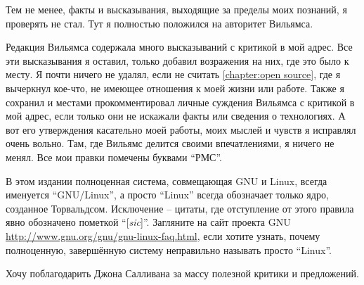 Тем не менее, факты и высказывания, выходящие за пределы моих познаний, я проверять не стал. Тут я полностью положился на авторитет Вильямса.

Редакция Вильямса содержала много высказываний с критикой в мой адрес. Все эти высказывания я оставил, только добавил возражения на них, где это было к месту. Я почти ничего не удалял, если не считать \autoref{chapter:open source}, где я вычеркнул кое-что, не имеющее отношения к моей жизни или работе. Также я сохранил и местами прокомментировал личные суждения Вильямса с критикой в мой адрес, если только они не искажали факты или сведения о технологиях. А вот его утверждения касательно моей работы, моих мыслей и чувств я исправлял очень вольно. Там, где Вильямс делится своими впечатлениями, я ничего не менял. Все мои правки помечены буквами \enquote{РМС}.

В этом издании полноценная система, совмещающая GNU и Linux, всегда именуется \enquote{GNU/Linux}, а просто \enquote{Linux} всегда обозначает только ядро, созданное Торвальдсом. Исключение -- цитаты, где отступление от этого правила явно обозначено пометкой \enquote{[\textit{sic}]}. Загляните на сайт проекта GNU \url{http://www.gnu.org/gnu/gnu-linux-faq.html}, если хотите узнать, почему полноценную, завершённую систему неправильно называть просто \enquote{Linux}.

Хочу поблагодарить Джона Салливана за массу полезной критики и предложений.

